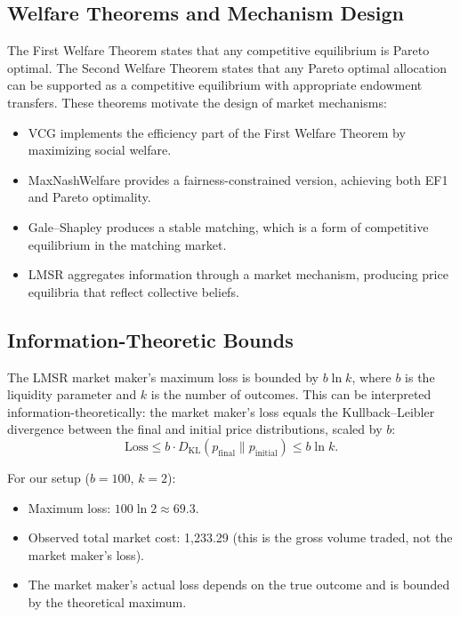\documentclass[10pt]{article}
\begin{document}
\subsection{Welfare Theorems and Mechanism Design}

The First Welfare Theorem states that any competitive equilibrium is Pareto optimal. The Second Welfare Theorem states that any Pareto optimal allocation can be supported as a competitive equilibrium with appropriate endowment transfers. These theorems motivate the design of market mechanisms:

\begin{itemize}[leftmargin=*,itemsep=1pt]
  \item VCG implements the efficiency part of the First Welfare Theorem by maximizing social welfare.
  \item MaxNashWelfare provides a fairness-constrained version, achieving both EF1 and Pareto optimality.
  \item Gale--Shapley produces a stable matching, which is a form of competitive equilibrium in the matching market.
  \item LMSR aggregates information through a market mechanism, producing price equilibria that reflect collective beliefs.
\end{itemize}

\subsection{Information-Theoretic Bounds}

The LMSR market maker's maximum loss is bounded by $b \ln k$, where $b$ is the liquidity parameter and $k$ is the number of outcomes. This can be interpreted information-theoretically: the market maker's loss equals the Kullback--Leibler divergence between the final and initial price distributions, scaled by $b$:
\begin{equation}
\text{Loss} \leq b \cdot D_{\text{KL}}(p_{\text{final}} \| p_{\text{initial}}) \leq b \ln k.
\end{equation}

For our setup ($b = 100$, $k = 2$):
\begin{itemize}
  \item Maximum loss: $100 \ln 2 \approx 69.3$.
  \item Observed total market cost: 1{,}233.29 (this is the gross volume traded, not the market maker's loss).
  \item The market maker's actual loss depends on the true outcome and is bounded by the theoretical maximum.
\end{itemize}
\end{document}
